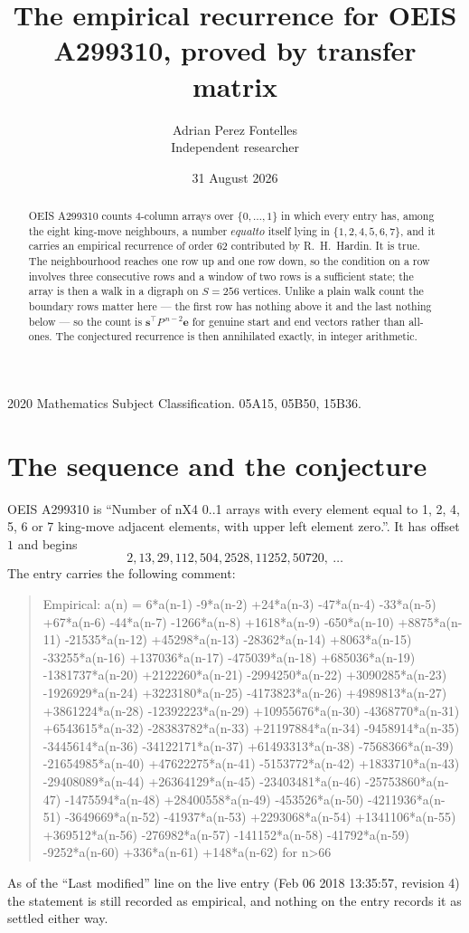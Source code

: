 \documentclass[11pt,a4paper]{article}
\title{The empirical recurrence for OEIS A299310, proved by transfer matrix}
\author{Adrian Perez Fontelles\\ \small Independent researcher}
\date{31 August 2026}
\theoremstyle{plain}
\theoremstyle{definition}
\begin{document}
\maketitle

\begin{abstract}
OEIS A299310 counts $4$-column arrays over $\{0,\dots,1\}$ in which every entry has,
among the eight king-move neighbours, a number $equal to$ itself lying in $\{1,2,4,5,6,7\}$, and it carries an empirical
recurrence of order $62$ contributed by R.~H.~Hardin. It is true. The neighbourhood
reaches one row up and one row down, so the condition on a row involves three consecutive
rows and a window of two rows is a sufficient state; the array is then a walk in a digraph
on $S=256$ vertices. Unlike a plain walk count the boundary rows matter here --- the first
row has nothing above it and the last nothing below --- so the count is
$\mathbf{s}^{\!\top}P^{\,n-2}\mathbf{e}$ for genuine start and end vectors rather than
all-ones. The conjectured recurrence is then annihilated exactly, in integer arithmetic.
\end{abstract}

\noindent\small 2020 Mathematics Subject Classification. 05A15, 05B50, 15B36.\normalsize

\section{The sequence and the conjecture}

OEIS A299310 is ``Number of nX4 0..1 arrays with every element equal to 1, 2, 4, 5, 6 or 7 king-move adjacent elements, with upper left element zero.''. It has offset
$1$ and begins
\[
2, 13, 29, 112, 504, 2528, 11252, 50720,\ \dots
\]
The entry carries the following comment:
\begin{quote}\small
Empirical: a(n) = 6*a(n-1) -9*a(n-2) +24*a(n-3) -47*a(n-4) -33*a(n-5) +67*a(n-6) -44*a(n-7) -1266*a(n-8) +1618*a(n-9) -650*a(n-10) +8875*a(n-11) -21535*a(n-12) +45298*a(n-13) -28362*a(n-14) +8063*a(n-15) -33255*a(n-16) +137036*a(n-17) -475039*a(n-18) +685036*a(n-19) -1381737*a(n-20) +2122260*a(n-21) -2994250*a(n-22) +3090285*a(n-23) -1926929*a(n-24) +3223180*a(n-25) -4173823*a(n-26) +4989813*a(n-27) +3861224*a(n-28) -12392223*a(n-29) +10955676*a(n-30) -4368770*a(n-31) +6543615*a(n-32) -28383782*a(n-33) +21197884*a(n-34) -9458914*a(n-35) -3445614*a(n-36) -34122171*a(n-37) +61493313*a(n-38) -7568366*a(n-39) -21654985*a(n-40) +47622275*a(n-41) -5153772*a(n-42) +1833710*a(n-43) -29408089*a(n-44) +26364129*a(n-45) -23403481*a(n-46) -25753860*a(n-47) -1475594*a(n-48) +28400558*a(n-49) -453526*a(n-50) -4211936*a(n-51) -3649669*a(n-52) -41937*a(n-53) +2293068*a(n-54) +1341106*a(n-55) +369512*a(n-56) -276982*a(n-57) -141152*a(n-58) -41792*a(n-59) -9252*a(n-60) +336*a(n-61) +148*a(n-62) for n>66
\end{quote}
As of the ``Last modified'' line on the live entry (Feb 06 2018 13:35:57, revision
4) the statement is still recorded as empirical, and nothing on the entry
records it as settled either way.
\end{document}
